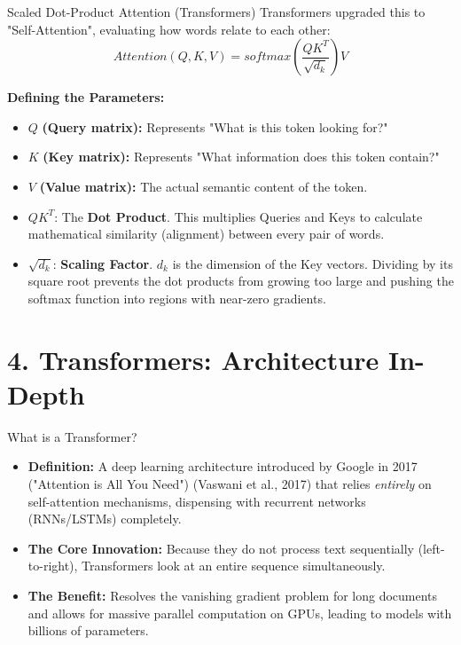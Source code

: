 \documentclass[aspectratio=169]{beamer}
\begin{document}
	\begin{frame}{Scaled Dot-Product Attention (Transformers)}
		Transformers upgraded this to "Self-Attention", evaluating how words relate to each other:
		$$Attention(Q, K, V) = softmax\left(\frac{QK^T}{\sqrt{d_k}}\right)V$$
		
		\textbf{Defining the Parameters:}
		\begin{itemize}
			\item $Q$ \textbf{(Query matrix):} Represents "What is this token looking for?"
			\item $K$ \textbf{(Key matrix):} Represents "What information does this token contain?"
			\item $V$ \textbf{(Value matrix):} The actual semantic content of the token.
			\item $QK^T$: The \textbf{Dot Product}. This multiplies Queries and Keys to calculate mathematical similarity (alignment) between every pair of words.
			\item $\sqrt{d_k}$: \textbf{Scaling Factor}. $d_k$ is the dimension of the Key vectors. Dividing by its square root prevents the dot products from growing too large and pushing the softmax function into regions with near-zero gradients.
		\end{itemize}
	\end{frame}
	
	\section{4. Transformers: Architecture In-Depth}
	
	\begin{frame}{What is a Transformer?}
		\begin{itemize}
			\item \textbf{Definition:} A deep learning architecture introduced by Google in 2017 ("Attention is All You Need") (Vaswani et al., 2017) that relies \textit{entirely} on self-attention mechanisms, dispensing with recurrent networks (RNNs/LSTMs) completely.
			\item \textbf{The Core Innovation:} Because they do not process text sequentially (left-to-right), Transformers look at an entire sequence simultaneously. 
			\item \textbf{The Benefit:} Resolves the vanishing gradient problem for long documents and allows for massive parallel computation on GPUs, leading to models with billions of parameters.
		\end{itemize}
	\end{frame}
	
\end{document}
